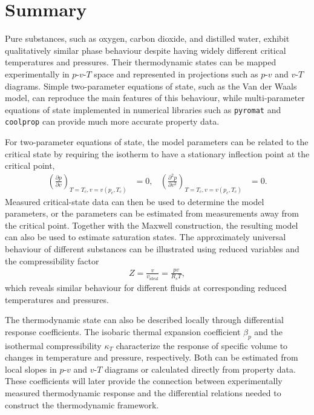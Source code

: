 \section{Summary}
Pure substances, such as oxygen, carbon dioxide, and distilled water,
exhibit qualitatively similar phase behaviour despite having widely
different critical temperatures and pressures. Their thermodynamic states
can be mapped experimentally in $p$-$v$-$T$ space and represented in
projections such as $p$-$v$ and $v$-$T$ diagrams. Simple two-parameter
equations of state, such as the Van der Waals model, can reproduce the
main features of this behaviour, while multi-parameter equations of
state implemented in numerical libraries such as \verb|pyromat| and
\verb|coolprop| can provide much more accurate property data.

For two-parameter equations of state, the model parameters can be related
to the critical state by requiring the isotherm to have a stationary
inflection point at the critical point,
\begin{align}
    \left(\frac{\partial p}{\partial v}\right)_{T=T_c,v=v(p_c,T_c)} &= 0,
    &
    \left(\frac{\partial^2 p}{\partial v^2}\right)_{T=T_c,v=v(p_c,T_c)} &= 0.
\end{align}
Measured critical-state data can then be used to determine the model
parameters, or the parameters can be estimated from measurements away
from the critical point. Together with the Maxwell construction, the
resulting model can also be used to estimate saturation states. The
approximately universal behaviour of different substances can be
illustrated using reduced variables and the compressibility factor
\begin{align}
    Z = \frac{v}{v_{\mathrm{ideal}}}=\frac{pv}{R_sT},
\end{align}
which reveals similar behaviour for different fluids at corresponding
reduced temperatures and pressures.

The thermodynamic state can also be described locally through differential
response coefficients. The isobaric thermal expansion coefficient
$\beta_p$ and the isothermal compressibility $\kappa_T$ characterize the
response of specific volume to changes in temperature and pressure,
respectively. Both can be estimated from local slopes in $p$-$v$ and
$v$-$T$ diagrams or calculated directly from property data. These
coefficients will later provide the connection between experimentally
measured thermodynamic response and the differential relations needed to
construct the thermodynamic framework.

